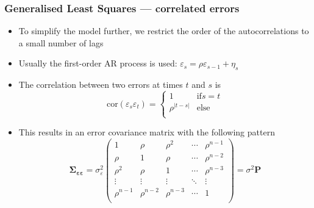 \documentclass{beamer}
\begin{document}
\begin{frame}
    \frametitle{Generalised Least Squares --- correlated errors}
    \begin{itemize}
        \item To simplify the model further, we restrict the order of the autocorrelations to a small number of lags
        \item Usually the first-order AR process is used: $\varepsilon_s = \rho \varepsilon_{s-1} + \eta_s$
        \item The correlation between two errors at times $t$ and $s$ is
        $$\mathrm{cor}(\varepsilon_s \varepsilon_t) = \left\lbrace \begin{array}{ll}
            1            & \mathrm{if} s = t \\
            \rho^{|t-s|} & \mathrm{else}     \\
        \end{array}
        \right. $$
        \item This results in an error covariance matrix with the following pattern
        $$\mathbf{\Sigma_{\varepsilon \varepsilon}} = \sigma^2_\varepsilon \left( \begin{array}{ccccc}
                     1          & \rho       & \rho^2     & \cdots & \rho^{n-1} \\
                     \rho       & 1          & \rho       & \cdots & \rho^{n-2} \\
                     \rho^2     & \rho       & 1          & \cdots & \rho^{n-3} \\
                     \vdots     & \vdots     & \vdots     & \ddots & \vdots     \\
                     \rho^{n-1} & \rho^{n-2} & \rho^{n-3} & \cdots & 1          \\
                 \end{array} \right) = \sigma^2\mathbf{P}$$
    \end{itemize}
\end{frame}
\end{document}
